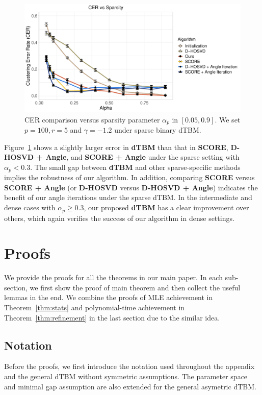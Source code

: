 \documentclass[journal]{IEEEtran}
\theoremstyle{definition}
\theoremstyle{definition}
\begin{document}
\begin{figure}[htp!]
    \centering
    \includegraphics[width=1\columnwidth]{sparsity.pdf}
    \caption{CER comparison versus sparsity parameter $\alpha_p$ in $[0.05, 0.9]$. We set $p = 100, r = 5$ and $\gamma = -1.2$ under sparse binary dTBM.}
    \label{fig:sparse}
\end{figure}

  
Figure~\ref{fig:sparse} shows a slightly larger error in \textbf{\small dTBM} than that in \textbf{\small SCORE}, \textbf{\small D-HOSVD + Angle}, and \textbf{\small SCORE + Angle} under the sparse setting with $\alpha_p < 0.3$. 
The small gap between  \textbf{\small dTBM} and other sparse-specific methods implies the robustness of our algorithm. In addition, comparing \textbf{\small SCORE} versus \textbf{\small SCORE + Angle} (or \textbf{\small D-HOSVD} versus \textbf{\small D-HOSVD + Angle}) indicates the benefit of our angle iterations under the sparse dTBM. In the intermediate and dense cases with $\alpha_p \geq 0.3$, our proposed \textbf{\small dTBM} has a clear improvement over others, which again verifies the success of our algorithm in dense settings.

\section{Proofs}

We provide the proofs for all the theorems in our main paper. In each sub-section, we first show the proof of main theorem and then collect the useful lemmas in the end.   {We combine the proofs of MLE achievement in Theorem~\ref{thm:stats} and polynomial-time achievement in Theorem~\ref{thm:refinement} in the last section due to the similar idea. }

\subsection{Notation}
Before the proofs, we first introduce the notation used throughout the appendix and the general dTBM without symmetric assumptions. The parameter space and minimal gap assumption are also extended for the general asymetric dTBM.
\end{document}

